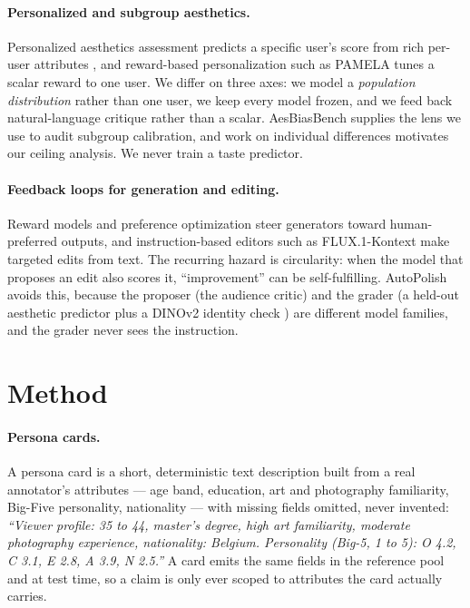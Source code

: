 \documentclass{article}
\begin{document}
\paragraph{Personalized and subgroup aesthetics.} Personalized aesthetics assessment predicts a specific user's score from rich per-user attributes \citep{yang2022para}, and reward-based personalization such as PAMELA \citep{pamela2026} tunes a scalar reward to one user. We differ on three axes: we model a \emph{population distribution} rather than one user, we keep every model frozen, and we feed back natural-language critique rather than a scalar. AesBiasBench \citep{aesbiasbench2025} supplies the lens we use to audit subgroup calibration, and work on individual differences \citep{individual2025} motivates our ceiling analysis. We never train a taste predictor.

\paragraph{Feedback loops for generation and editing.} Reward models and preference optimization steer generators toward human-preferred outputs, and instruction-based editors such as FLUX.1-Kontext \citep{flux2024} make targeted edits from text. The recurring hazard is circularity: when the model that proposes an edit also scores it, ``improvement'' can be self-fulfilling. AutoPolish avoids this, because the proposer (the audience critic) and the grader (a held-out aesthetic predictor \citep{schuhmann2022} plus a DINOv2 identity check \citep{oquab2023}) are different model families, and the grader never sees the instruction.


\section{Method}

\paragraph{Persona cards.} A persona card is a short, deterministic text description built from a real annotator's attributes --- age band, education, art and photography familiarity, Big-Five personality, nationality --- with missing fields omitted, never invented: \emph{``Viewer profile: 35 to 44, master's degree, high art familiarity, moderate photography experience, nationality: Belgium. Personality (Big-5, 1 to 5): O 4.2, C 3.1, E 2.8, A 3.9, N 2.5.''} A card emits the same fields in the reference pool and at test time, so a claim is only ever scoped to attributes the card actually carries.
\end{document}
